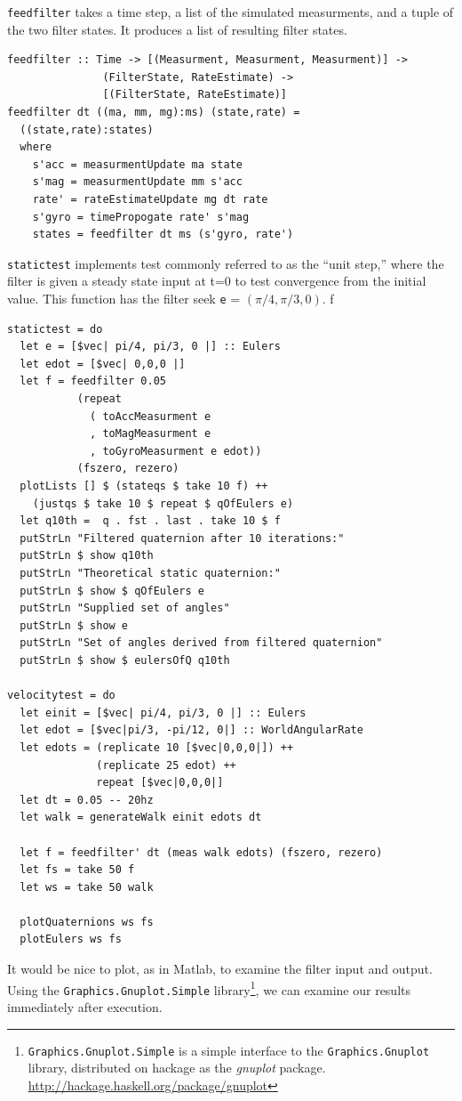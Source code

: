 \documentclass[12pt]{report}
\begin{document}
\lstinline$feedfilter$ takes a time step, a list of the simulated measurments, and a tuple of the two filter states. It produces a list of resulting filter states. 

\begin{lstlisting}
feedfilter :: Time -> [(Measurment, Measurment, Measurment)] -> 
               (FilterState, RateEstimate) -> 
               [(FilterState, RateEstimate)]
feedfilter dt ((ma, mm, mg):ms) (state,rate) = 
  ((state,rate):states)
  where 
    s'acc = measurmentUpdate ma state
    s'mag = measurmentUpdate mm s'acc
    rate' = rateEstimateUpdate mg dt rate
    s'gyro = timePropogate rate' s'mag
    states = feedfilter dt ms (s'gyro, rate')
\end{lstlisting}

\lstinline$statictest$ implements test commonly referred to as the ``unit step,'' where the filter is given a steady state input at t=0 to test convergence from the initial value. This function has the filter seek \lstinline$e$ = $(\pi/4, \pi/3, 0)$. f

\begin{lstlisting}
statictest = do
  let e = [$vec| pi/4, pi/3, 0 |] :: Eulers
  let edot = [$vec| 0,0,0 |]
  let f = feedfilter 0.05 
           (repeat 
             ( toAccMeasurment e
             , toMagMeasurment e
             , toGyroMeasurment e edot)) 
           (fszero, rezero)
  plotLists [] $ (stateqs $ take 10 f) ++ 
    (justqs $ take 10 $ repeat $ qOfEulers e)
  let q10th =  q . fst . last . take 10 $ f
  putStrLn "Filtered quaternion after 10 iterations:"
  putStrLn $ show q10th
  putStrLn "Theoretical static quaternion:"
  putStrLn $ show $ qOfEulers e
  putStrLn "Supplied set of angles"
  putStrLn $ show e
  putStrLn "Set of angles derived from filtered quaternion"
  putStrLn $ show $ eulersOfQ q10th

velocitytest = do
  let einit = [$vec| pi/4, pi/3, 0 |] :: Eulers
  let edot = [$vec|pi/3, -pi/12, 0|] :: WorldAngularRate
  let edots = (replicate 10 [$vec|0,0,0|]) ++ 
              (replicate 25 edot) ++ 
              repeat [$vec|0,0,0|]
  let dt = 0.05 -- 20hz
  let walk = generateWalk einit edots dt
 
  let f = feedfilter' dt (meas walk edots) (fszero, rezero) 
  let fs = take 50 f
  let ws = take 50 walk

  plotQuaternions ws fs
  plotEulers ws fs
\end{lstlisting}

It would be nice to plot, as in Matlab, to examine the filter input and output. Using the \lstinline$Graphics.Gnuplot.Simple$ library\footnote{\lstinline$Graphics.Gnuplot.Simple$ is a simple interface to the \lstinline$Graphics.Gnuplot$ library, distributed on hackage as the \emph{gnuplot} package. \url{http://hackage.haskell.org/package/gnuplot}}, we can examine our results immediately after execution. 
\end{document}
